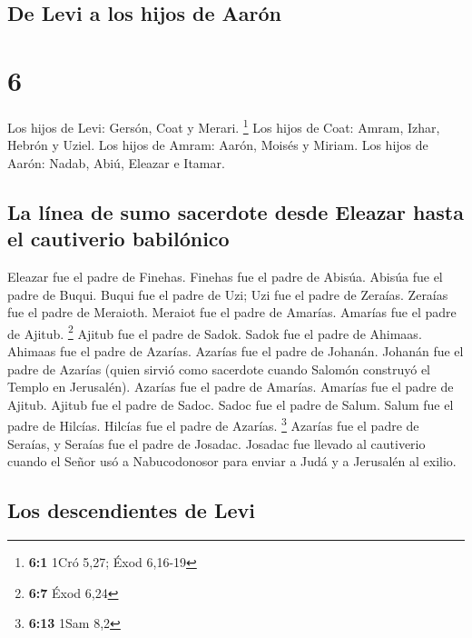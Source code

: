 \hypertarget{de-levi-a-los-hijos-de-aaruxf3n}{%
\subsection{De Levi a los hijos de
Aarón}\label{de-levi-a-los-hijos-de-aaruxf3n}}

\hypertarget{section-5}{%
\section{6}\label{section-5}}

 Los hijos de Levi: Gersón, Coat y Merari. \footnote{\textbf{6:1}
  1Cró 5,27; Éxod 6,16-19}  Los hijos de Coat: Amram,
Izhar, Hebrón y Uziel.  Los hijos de Amram: Aarón, Moisés
y Miriam. Los hijos de Aarón: Nadab, Abiú, Eleazar e Itamar.

\hypertarget{la-luxednea-de-sumo-sacerdote-desde-eleazar-hasta-el-cautiverio-babiluxf3nico}{%
\subsection{La línea de sumo sacerdote desde Eleazar hasta el cautiverio
babilónico}\label{la-luxednea-de-sumo-sacerdote-desde-eleazar-hasta-el-cautiverio-babiluxf3nico}}

 Eleazar fue el padre de Finehas. Finehas fue el padre de
Abisúa.  Abisúa fue el padre de Buqui. Buqui fue el padre
de Uzi;  Uzi fue el padre de Zeraías. Zeraías fue el padre
de Meraioth.  Meraiot fue el padre de Amarías. Amarías fue
el padre de Ajitub. \footnote{\textbf{6:7} Éxod 6,24} 
Ajitub fue el padre de Sadok. Sadok fue el padre de Ahimaas.
 Ahimaas fue el padre de Azarías. Azarías fue el padre de
Johanán.  Johanán fue el padre de Azarías (quien sirvió
como sacerdote cuando Salomón construyó el Templo en Jerusalén).
 Azarías fue el padre de Amarías. Amarías fue el padre de
Ajitub.  Ajitub fue el padre de Sadoc. Sadoc fue el padre
de Salum.  Salum fue el padre de Hilcías. Hilcías fue el
padre de Azarías. \footnote{\textbf{6:13} 1Sam 8,2} 
Azarías fue el padre de Seraías, y Seraías fue el padre de Josadac.
 Josadac fue llevado al cautiverio cuando el Señor usó a
Nabucodonosor para enviar a Judá y a Jerusalén al exilio.

\hypertarget{los-descendientes-de-levi}{%
\subsection{Los descendientes de Levi}\label{los-descendientes-de-levi}}

